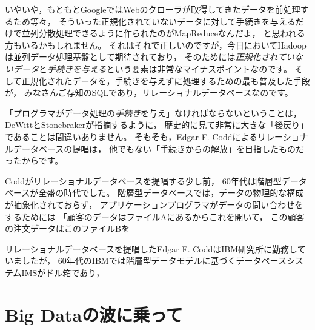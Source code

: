 いやいや，もともとGoogleではWebのクローラが取得してきたデータを前処理するため等々，
そういった正規化されていないデータに対して手続きを与えるだけで並列分散処理できるように作られたのがMapReduceなんだよ，
と思われる方もいるかもしれません。
それはそれで正しいのですが，今日においてHadoopは並列データ処理基盤として期待されており，
そのためには{\em 正規化されていないデータ}と{\em 手続きを与える}という要素は非常なマイナスポイントなのです。
そして正規化されたデータを，手続きを与えずに処理するための最も普及した手段が，
みなさんご存知のSQLであり，リレーショナルデータベースなのです。

「プログラマがデータ処理の{\em 手続き}を与え」なければならないということは，
DeWittとStonebrakerが指摘するように，
歴史的に見て非常に大きな「後戻り」であることは間違いありません。
そもそも，Edgar F. Coddによるリレーショナルデータベースの提唱は，
他でもない「手続きからの解放」を目指したものだったからです。

Coddがリレーショナルデータベースを提唱する少し前，
60年代は階層型データベースが全盛の時代でした。
階層型データベースでは，データの物理的な構成が抽象化されておらず，
アプリケーションプログラマがデータの問い合わせをするためには
「顧客のデータはファイルAにあるからこれを開いて，
この顧客の注文データはこのファイルBを



リレーショナルデータベースを提唱したEdgar F. CoddはIBM研究所に勤務していましたが，
60年代のIBMでは階層型データモデルに基づくデータベースシステムIMSがドル箱であり，


\section{Big Dataの波に乗って}
